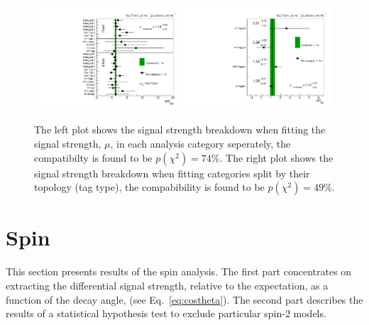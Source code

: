 \begin{figure}
  \includegraphics[width=0.49\textwidth]{results/plots/mva_chcomp.pdf}
  \includegraphics[width=0.49\textwidth]{results/plots/mva_topo_scan.pdf}
  \caption[The observed compatibility of the signal strength between channels]{The left plot shows the signal strength breakdown when fitting the signal strength, $\mu$, in each analysis category seperately, the compatibilty is found to be $p(\chi^{2})=74\%$. The right plot shows the signal strength breakdown when fitting categories split by their topology (tag type), the compabibility is found to be $p(\chi^{2})=49\%$.}
  \label{fig:res_chcomp}
\end{figure}

\section{Spin}
\label{sec:spin_results}

This section presents results of the spin analysis. The first part concentrates on extracting the differential signal strength, relative to the \SM expectation, as a function of the decay angle, \costhetastar (see Eq.~\ref{eq:costheta}). The second part describes the results of a statistical hypothesis test to exclude particular spin-2 models.


